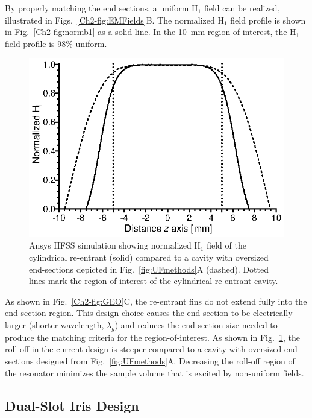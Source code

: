 By properly matching the end sections, a uniform H$_1$ field can be realized, illustrated in Figs.~\ref{Ch2-fig:EMFields}B. The normalized H$_1$ field profile is shown in Fig.~\ref{Ch2-fig:normb1} as a solid line. In the 10~mm region-of-interest, the H$_1$ field profile is 98\% uniform. 

\begin{figure}[htb]\centering
 \includegraphics{Kapitel/Ch2-Images/ComparisonOfEndSections.eps}
 \caption[Ansys HFSS simulation comparing oversized and re-entrant end sections.]{Ansys HFSS simulation showing normalized H$_1$ field of the cylindrical re-entrant \cylTE{} (solid) compared to a \cylTE{} cavity with oversized end-sections depicted in Fig.~\ref{fig:UFmethods}A (dashed). Dotted lines mark the region-of-interest of the cylindrical re-entrant \cylTE{} cavity. }
 \label{Ch2-fig:normb1compare}
\end{figure}

As shown in Fig.~\ref{Ch2-fig:GEO}C, the re-entrant fins do not extend fully into the end section region. This design choice causes the end section to be electrically larger (shorter wavelength, $\lambda_g$) and reduces the end-section size needed to produce the matching criteria for the region-of-interest. As shown in Fig.~\ref{Ch2-fig:normb1compare}, the roll-off in the current design is steeper compared to a \cylTE{} cavity with oversized end-sections designed from Fig.~\ref{fig:UFmethods}A. Decreasing the roll-off region of the resonator minimizes the sample volume that is excited by non-uniform fields.

\subsection{Dual-Slot Iris Design}

